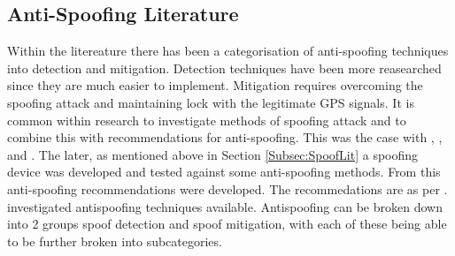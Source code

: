 %
%

\subsection{Anti-Spoofing Literature}
Within the litereature there has been a categorisation of anti-spoofing techniques into detection and mitigation. Detection techniques have been more reasearched since they
are much easier to implement. Mitigation requires overcoming the spoofing attack and maintaining lock with the legitimate GPS signals. It is common within research to
investigate methods of spoofing attack and to combine this with recommendations for anti-spoofing. This was the case with \textcite{RN6}, \textcite{RN32},
\textcite{RN33} and \textcite{RN23}. The later, as mentioned above in Section \ref{Subsec:SpoofLit} a spoofing device was developed and tested against some anti-spoofing
methods. From this anti-spoofing recommendations were developed. The recommedations are as per \citeauthor{RN6}. \textcite{RN6} investigated antispoofing techniques
available. Antispoofing can be broken down into 2 groups spoof detection and spoof mitigation, with each of these being able to be further broken into subcategories. 

